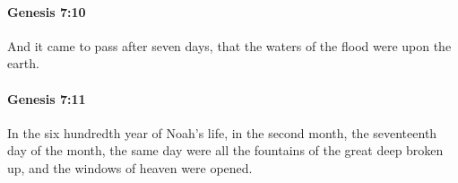 		\paragraph{Genesis 7:10} %
			\label{GENESIS-7-10}

			And it came to pass after seven days, that the waters of the flood were upon the earth.


		\paragraph{Genesis 7:11} %
			\label{GENESIS-7-11}

			In the six hundredth year of Noah's life, in the second month, the seventeenth day of the month, the same day were all the fountains of the great deep broken up, and the windows of heaven were opened.


